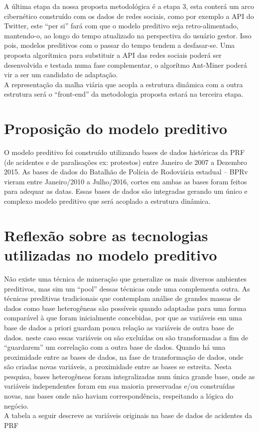  A última etapa da nossa proposta metodológica é a etapa 3, esta conterá um arco cibernético construído com os dados de redes sociais, como por exemplo a API do Twitter, este ``per si'' fará com que o modelo preditivo seja retro-alimentado, 
 mantendo-o, ao longo do tempo atualizado na perspectiva do usuário gestor. Isso pois, modelos preditivos com o passar do tempo tendem a desfasar-se. 
 Uma proposta algorítmica para substituir a API das redes sociais 
 poderá ser desenvolvida e testada numa fase complementar, o algorítmo Ant-Miner poderá vir a ser um candidato de adaptação.\\
 
 A representação da malha viária que acopla a estrutura dinâmica com a outra estrutura será o ``front-end'' da metodologia proposta estará na 
 terceira etapa.


\section{ Proposição do modelo preditivo}

O modelo preditivo foi construído utilizando bases de dados históricas da PRF (de acidentes e de paralisações ex: protestos) entre Janeiro de 2007 a 
Dezembro 2015. As bases de dados do Batalhão de Polícia de Rodoviária estadual -- BPRv vieram entre Janeiro/2010 a Julho/2016, cortes em ambas as bases foram 
feitos para adequar as datas. Essas bases de dados são integradas gerando um único e complexo modelo preditivo que será acoplado a estrutura dinâmica.



\section{ Reflexão sobre as tecnologias utilizadas no modelo preditivo}\label{result}

Não existe uma técnica de mineração que generalize os mais diversos ambientes preditivos, mas sim um ``pool'' dessas técnicas onde uma complementa outra.
As técnicas preditivas tradicionais que contemplam análise de grandes massas de dados como base heterogêneas são possíveis quando adaptadas para uma forma comparável à que
foram inicialmente concebidas, por que as variáveis em uma base de dados a priori guardam pouca relação as variáveis de outra base de dados.
neste caso essas variáveis ou são excluídas ou são transformadas a fim de ``guardarem'' um correlação com a outra base de dados. 
Quando há uma proximidade entre as bases de dados, na fase de transformação de dados, onde são criadas novas variáveis, a proximidade entre as
bases se estreita. 
Nesta pesquisa, bases heterogêneas foram integralizadas num única grande base, onde as variáveis independentes foram
em sua maioria preservadas e/ou construídas novas, nas bases onde não haviam correspondência, respeitando a lógica do negócio.\\
A tabela a seguir descreve as variáveis originais na base de dados de acidentes da PRF 


